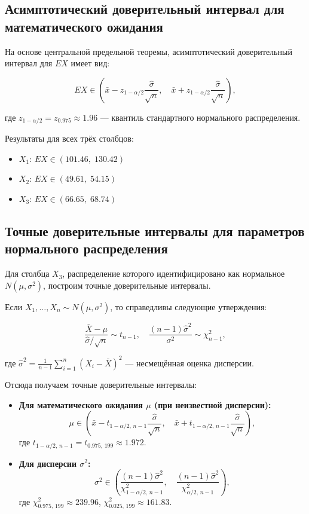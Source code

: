 \subsection{Асимптотический доверительный интервал для математического ожидания}

На основе центральной предельной теоремы, асимптотический доверительный интервал для $EX$ имеет вид:

$$
EX \in \left( \bar{x} - z_{1-\alpha/2} \frac{\hat{\sigma}}{\sqrt{n}}, \quad \bar{x} + z_{1-\alpha/2} \frac{\hat{\sigma}}{\sqrt{n}} \right),
$$

где $z_{1-\alpha/2} = z_{0.975} \approx 1.96$ — квантиль стандартного нормального распределения.

Результаты для всех трёх столбцов:

\begin{itemize}
    \item $X_1$: $EX \in (101.46, \; 130.42)$
    \item $X_2$: $EX \in (49.61, \; 54.15)$
    \item $X_3$: $EX \in (66.65, \; 68.74)$
\end{itemize}

\subsection{Точные доверительные интервалы для параметров нормального распределения}

Для столбца $X_3$, распределение которого идентифицировано как нормальное $N(\mu, \sigma^2)$, построим точные доверительные интервалы.

Если $X_1, \dots, X_n \sim N(\mu, \sigma^2)$, то справедливы следующие утверждения:

$$
\frac{\bar{X} - \mu}{\hat{\sigma}/\sqrt{n}} \sim t_{n-1}, \quad \frac{(n-1)\hat{\sigma}^2}{\sigma^2} \sim \chi^2_{n-1},
$$

где $\hat{\sigma}^2 = \frac{1}{n-1} \sum_{i=1}^{n} (X_i - \bar{X})^2$ — несмещённая оценка дисперсии.

Отсюда получаем точные доверительные интервалы:

\begin{itemize}
    \item \textbf{Для математического ожидания $\mu$ (при неизвестной дисперсии):}
    $$
    \mu \in \left( \bar{x} - t_{1-\alpha/2,\, n-1} \frac{\hat{\sigma}}{\sqrt{n}}, \quad \bar{x} + t_{1-\alpha/2,\, n-1} \frac{\hat{\sigma}}{\sqrt{n}} \right),
    $$
    где $t_{1-\alpha/2,\, n-1} = t_{0.975,\, 199} \approx 1.972$.
    
    \item \textbf{Для дисперсии $\sigma^2$:}
    $$
    \sigma^2 \in \left( \frac{(n-1)\hat{\sigma}^2}{\chi^2_{1-\alpha/2,\, n-1}}, \quad \frac{(n-1)\hat{\sigma}^2}{\chi^2_{\alpha/2,\, n-1}} \right),
    $$
    где $\chi^2_{0.975,\, 199} \approx 239.96$, $\chi^2_{0.025,\, 199} \approx 161.83$.
\end{itemize}

